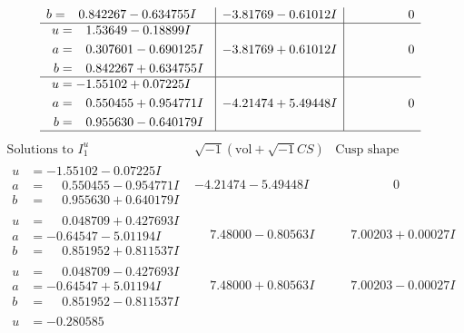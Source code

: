 \documentclass[1p]{elsarticle_modified}
\theoremstyle{definition}
\newcommand{\I}{\sqrt{-1}}
\begin{document}
$$\begin{array}{c|c|c}
\begin{aligned}
b &= \phantom{-}0.842267 - 0.634755 I\end{aligned}
 & -3.81769 - 0.61012 I & \phantom{-0.000000 } 0 \\ \hline\begin{aligned}
u &= \phantom{-}1.53649 - 0.18899 I \\
a &= \phantom{-}0.307601 - 0.690125 I \\
b &= \phantom{-}0.842267 + 0.634755 I\end{aligned}
 & -3.81769 + 0.61012 I & \phantom{-0.000000 } 0 \\ \hline\begin{aligned}
u &= -1.55102 + 0.07225 I \\
a &= \phantom{-}0.550455 + 0.954771 I \\
b &= \phantom{-}0.955630 - 0.640179 I\end{aligned}
 & -4.21474 + 5.49448 I & \phantom{-0.000000 } 0\\
 \hline 
 \end{array}$$\newpage$$\begin{array}{c|c|c}  
\text{Solutions to }I^u_{1}& \I (\text{vol} + \sqrt{-1}CS) & \text{Cusp shape}\\
 \hline 
\begin{aligned}
u &= -1.55102 - 0.07225 I \\
a &= \phantom{-}0.550455 - 0.954771 I \\
b &= \phantom{-}0.955630 + 0.640179 I\end{aligned}
 & -4.21474 - 5.49448 I & \phantom{-0.000000 } 0 \\ \hline\begin{aligned}
u &= \phantom{-}0.048709 + 0.427693 I \\
a &= -0.64547 - 5.01194 I \\
b &= \phantom{-}0.851952 + 0.811537 I\end{aligned}
 & \phantom{-}7.48000 - 0.80563 I & \phantom{-}7.00203 + 0.00027 I \\ \hline\begin{aligned}
u &= \phantom{-}0.048709 - 0.427693 I \\
a &= -0.64547 + 5.01194 I \\
b &= \phantom{-}0.851952 - 0.811537 I\end{aligned}
 & \phantom{-}7.48000 + 0.80563 I & \phantom{-}7.00203 - 0.00027 I \\ \hline\begin{aligned}
u &= -0.280585\phantom{ +0.000000I} \\

\end{aligned}
\end{array}$$
\end{document}
